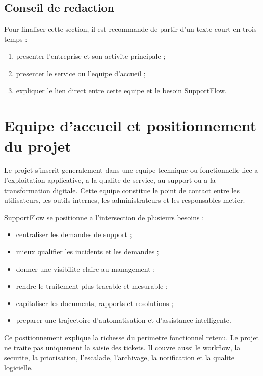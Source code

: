 \subsection{Conseil de redaction}

Pour finaliser cette section, il est recommande de partir d'un texte court en trois temps :

\begin{enumerate}[leftmargin=1.2cm]
  \item presenter l'entreprise et son activite principale ;
  \item presenter le service ou l'equipe d'accueil ;
  \item expliquer le lien direct entre cette equipe et le besoin SupportFlow.
\end{enumerate}

\section{Equipe d'accueil et positionnement du projet}

Le projet s'inscrit generalement dans une equipe technique ou fonctionnelle liee a l'exploitation applicative, a la qualite de service, au support ou a la transformation digitale. Cette equipe constitue le point de contact entre les utilisateurs, les outils internes, les administrateurs et les responsables metier.

SupportFlow se positionne a l'intersection de plusieurs besoins :

\begin{itemize}[leftmargin=1.2cm]
  \item centraliser les demandes de support ;
  \item mieux qualifier les incidents et les demandes ;
  \item donner une visibilite claire au management ;
  \item rendre le traitement plus tracable et mesurable ;
  \item capitaliser les documents, rapports et resolutions ;
  \item preparer une trajectoire d'automatisation et d'assistance intelligente.
\end{itemize}

Ce positionnement explique la richesse du perimetre fonctionnel retenu. Le projet ne traite pas uniquement la saisie des tickets. Il couvre aussi le workflow, la securite, la priorisation, l'escalade, l'archivage, la notification et la qualite logicielle.

